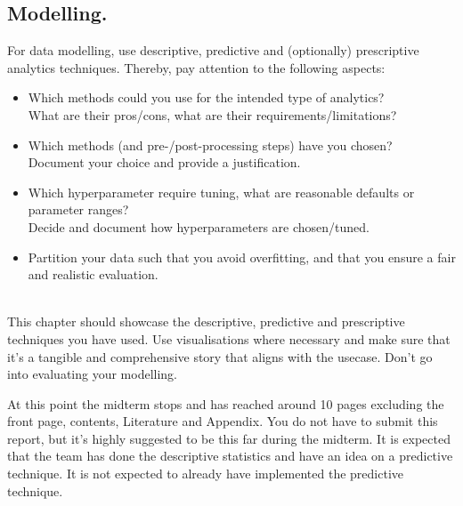\subsection{Modelling.}
For data modelling, use descriptive, predictive and (optionally) prescriptive analytics techniques. Thereby, pay attention to the following aspects:
\begin{itemize}
  \setlength\itemsep{0em}
  \item Which methods could you use for the intended type of analytics?
  \\ What are their pros/cons, what are their requirements/limitations?
  \item Which methods (and pre-/post-processing steps) have you chosen?
    \\ Document your choice and provide a justification.
  \item Which hyperparameter require tuning, what are reasonable defaults or parameter ranges? 
    \\ Decide and document how hyperparameters are chosen/tuned.
  \item Partition your data such that you avoid overfitting, and that you ensure a fair and realistic evaluation.
\end{itemize}\\
This chapter should showcase the descriptive, predictive and prescriptive techniques you have used. Use visualisations where necessary and make sure that it's a tangible and comprehensive story that aligns with the usecase. Don't go into evaluating your modelling.

At this point the midterm stops and has reached around 10 pages excluding the front page, contents, Literature and Appendix. You do not have to submit this report, but it's highly suggested to be this far during the midterm. It is expected that the team has done the descriptive statistics and have an idea on a predictive technique. It is not expected to already have implemented the predictive technique.
